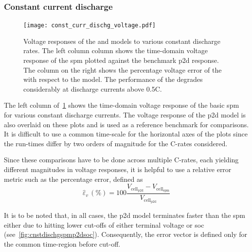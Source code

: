\subsubsection*{Constant current discharge}\label{subsubsec:cnstcurrdischgsim}

\begin{figure}[!htb]
    \centering
    \texttt{[image: const\_curr\_dischg\_voltage.pdf]}
    \caption[Voltage responses of  and  to
    constant current discharge]{Voltage responses of the  and
         models to various constant discharge rates. The left
        column column shows the time-domain voltage response of the \gls{spm}
        plotted against the benchmark \gls{p2d} response. The column on the
        right shows the percentage voltage error of the  with
        respect to the  model. The performance of the
         degrades considerably at discharge currents above
    0.5C.}
    \label{fig:cnstdischgspmp2dvoltage}
\end{figure}

The  left  column  of~\cref{fig:cnstdischgspmp2dvoltage} shows  the  time-domain
voltage response of the basic \gls{spm} for various constant discharge currents.
The voltage response of the \gls{p2d} model  is also overlaid on these plots and
is used  as a  reference benchmark  for comparisons.  It is  difficult to  use a
common  time-scale for  the horizontal  axes of  the plots  since the  run-times
differ by two orders of magnitude for the C-rates considered.

Since  these comparisons have
to  be done  across  multiple  C-rates, each  yielding  different magnitudes  in
voltage responses,  it is  helpful to use  a relative error  metric such  as the
percentage error, defined as
\begin{equation}
    \hat{\varepsilon}_v\,(\si{\percent}) = 100\frac{V_{\text{cell}_\text{p2d}} - V_{\text{cell}_\text{spm}}}{V_{\text{cell}_\text{p2d}}}
\end{equation}

It is to be noted that, in all cases, the \gls{p2d} model terminates faster than
the \gls{spm} either due to hitting lower cut-offs of either terminal voltage or
\gls{soc} (see~\cref{fig:cnstdischgspmp2dsoc}).  Consequently, the  error vector
is defined only for the common time-region before cut-off.

